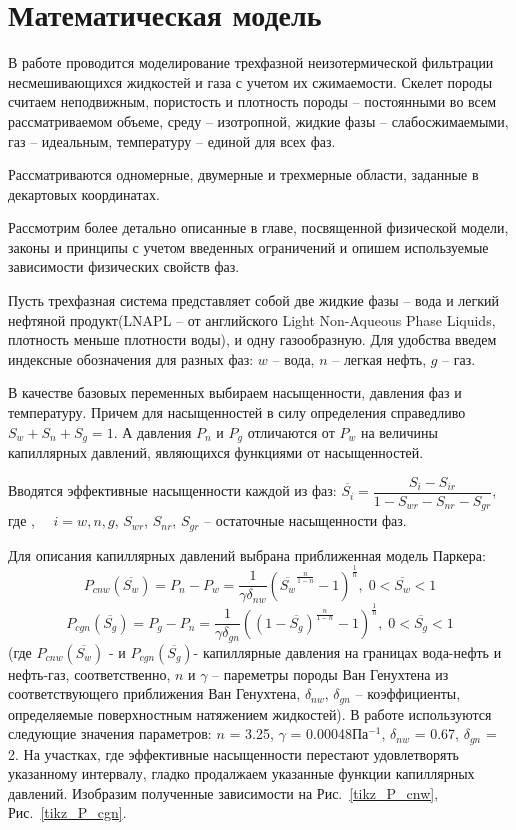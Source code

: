 %
\section{Математическая модель}
%
В работе проводится моделирование трехфазной неизотермической фильтрации 
несмешивающихся жидкостей и газа с учетом их сжимаемости. Скелет породы
считаем неподвижным, пористость и плотность породы -- постоянными во всем
рассматриваемом объеме, среду -- изотропной, жидкие фазы -- слабосжимаемыми,
газ -- идеальным, температуру -- единой для всех фаз.

Рассматриваются одномерные, двумерные и трехмерные
области, заданные в декартовых координатах.

Рассмотрим более детально описанные в главе, посвященной физической
модели, законы и принципы с учетом введенных ограничений и опишем
используемые зависимости физических свойств фаз.

Пусть трехфазная система представляет собой две жидкие фазы -- вода и легкий
нефтяной продукт(LNAPL -- от английского Light Non-Aqueous Phase Liquids,
плотность меньше плотности воды), и одну газообразную.
Для удобства введем индексные обозначения для разных фаз: $w$ -- вода, $n$ --
легкая нефть, $g$ -- газ.

В качестве базовых переменных выбираем насыщенности, давления фаз и температуру.
Причем для насыщенностей в силу определения справедливо  $S_w + S_n + S_g = 1$.
А давления $P_n$ и $P_g$ отличаются от $P_w$ на величины капиллярных
давлений, являющихся функциями от насыщенностей.

Вводятся эффективные насыщенности каждой из фаз:
$\overline{S_i}={\dfrac{S_i-S_{ir}}{1-S_{wr}-S_{nr}-S_{gr}}}$, где , ${\quad}i=w,n,g$, $S_{wr}$,
$S_{nr}$, $S_{gr}$ -- остаточные насыщенности фаз.

Для описания
капиллярных давлений выбрана приближенная модель Паркера\cite{Parker}:
$$P_{cnw}(\overline{S_w})=P_n-P_w={\frac{1}{\gamma \delta_{nw}}}
\left( \overline{S_w}^{\frac{n}{1-n}}-1 \right)^\frac{1}{n},\;0<\overline{S_w}<1 $$
$$P_{cgn}(\overline{S_g})=P_g-P_n={\frac{1}{\gamma \delta_{gn}}}
\left( (1-\overline{S_g})^{\frac{n}{1-n}}-1 \right)^\frac{1}{n},\;0<\overline{S_g}<1$$
(где $P_{cnw}(\overline{S_w})$ - и $P_{cgn}(\overline{S_g})$- капиллярные давления на границах вода-нефть и нефть-газ, 
соответственно, $n$ и $\gamma $ -- пареметры породы Ван Генухтена из соответствующего приближения
Ван Генухтена\cite{Genuchten}, $\delta_{nw}$, $\delta_{gn}$ -- коэффициенты, определяемые поверхностным натяжением 
жидкостей). В работе используются следующие значения параметров: $n$ = 3.25, $\gamma $ = 0.00048Па$^{-1}$,
$\delta_{nw}$ = 0.67, $\delta_{gn}$ = 2. На участках, где эффективные насыщенности перестают удовлетворять
указанному интервалу, гладко продалжаем указанные функции капиллярных давлений. Изобразим полученные зависимости
на Рис.~\ref{tikz_P_cnw}, Рис.~\ref{tikz_P_cgn}.

